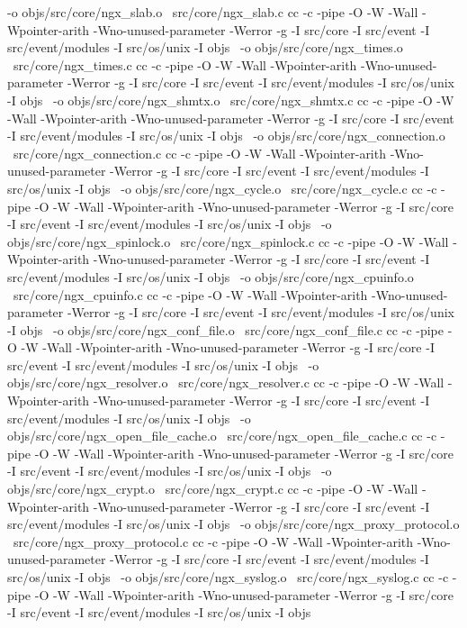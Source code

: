 	-o objs/src/core/ngx_slab.o \
	src/core/ngx_slab.c
cc -c -pipe  -O -W -Wall -Wpointer-arith -Wno-unused-parameter -Werror -g  -I src/core -I src/event -I src/event/modules -I src/os/unix -I objs \
	-o objs/src/core/ngx_times.o \
	src/core/ngx_times.c
cc -c -pipe  -O -W -Wall -Wpointer-arith -Wno-unused-parameter -Werror -g  -I src/core -I src/event -I src/event/modules -I src/os/unix -I objs \
	-o objs/src/core/ngx_shmtx.o \
	src/core/ngx_shmtx.c
cc -c -pipe  -O -W -Wall -Wpointer-arith -Wno-unused-parameter -Werror -g  -I src/core -I src/event -I src/event/modules -I src/os/unix -I objs \
	-o objs/src/core/ngx_connection.o \
	src/core/ngx_connection.c
cc -c -pipe  -O -W -Wall -Wpointer-arith -Wno-unused-parameter -Werror -g  -I src/core -I src/event -I src/event/modules -I src/os/unix -I objs \
	-o objs/src/core/ngx_cycle.o \
	src/core/ngx_cycle.c
cc -c -pipe  -O -W -Wall -Wpointer-arith -Wno-unused-parameter -Werror -g  -I src/core -I src/event -I src/event/modules -I src/os/unix -I objs \
	-o objs/src/core/ngx_spinlock.o \
	src/core/ngx_spinlock.c
cc -c -pipe  -O -W -Wall -Wpointer-arith -Wno-unused-parameter -Werror -g  -I src/core -I src/event -I src/event/modules -I src/os/unix -I objs \
	-o objs/src/core/ngx_cpuinfo.o \
	src/core/ngx_cpuinfo.c
cc -c -pipe  -O -W -Wall -Wpointer-arith -Wno-unused-parameter -Werror -g  -I src/core -I src/event -I src/event/modules -I src/os/unix -I objs \
	-o objs/src/core/ngx_conf_file.o \
	src/core/ngx_conf_file.c
cc -c -pipe  -O -W -Wall -Wpointer-arith -Wno-unused-parameter -Werror -g  -I src/core -I src/event -I src/event/modules -I src/os/unix -I objs \
	-o objs/src/core/ngx_resolver.o \
	src/core/ngx_resolver.c
cc -c -pipe  -O -W -Wall -Wpointer-arith -Wno-unused-parameter -Werror -g  -I src/core -I src/event -I src/event/modules -I src/os/unix -I objs \
	-o objs/src/core/ngx_open_file_cache.o \
	src/core/ngx_open_file_cache.c
cc -c -pipe  -O -W -Wall -Wpointer-arith -Wno-unused-parameter -Werror -g  -I src/core -I src/event -I src/event/modules -I src/os/unix -I objs \
	-o objs/src/core/ngx_crypt.o \
	src/core/ngx_crypt.c
cc -c -pipe  -O -W -Wall -Wpointer-arith -Wno-unused-parameter -Werror -g  -I src/core -I src/event -I src/event/modules -I src/os/unix -I objs \
	-o objs/src/core/ngx_proxy_protocol.o \
	src/core/ngx_proxy_protocol.c
cc -c -pipe  -O -W -Wall -Wpointer-arith -Wno-unused-parameter -Werror -g  -I src/core -I src/event -I src/event/modules -I src/os/unix -I objs \
	-o objs/src/core/ngx_syslog.o \
	src/core/ngx_syslog.c
cc -c -pipe  -O -W -Wall -Wpointer-arith -Wno-unused-parameter -Werror -g  -I src/core -I src/event -I src/event/modules -I src/os/unix -I objs \
